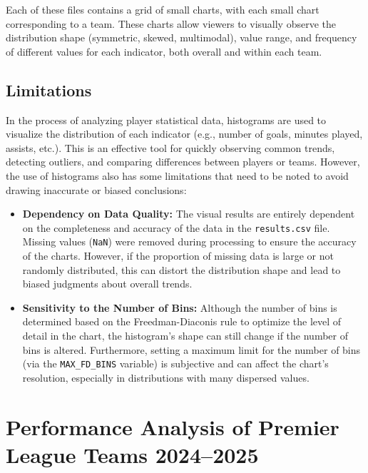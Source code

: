 \documentclass[12pt, a4paper]{report}
\begin{document}
Each of these files contains a grid of small charts, with each small chart corresponding to a team.
These charts allow viewers to visually observe the distribution shape (symmetric, skewed, multimodal), value range, and frequency of different values for each indicator, both overall and within each team.

\subsection{Limitations}
In the process of analyzing player statistical data, histograms are used to visualize the distribution of each indicator (e.g., number of goals, minutes played, assists, etc.).
This is an effective tool for quickly observing common trends, detecting outliers, and comparing differences between players or teams.
However, the use of histograms also has some limitations that need to be noted to avoid drawing inaccurate or biased conclusions:
\begin{itemize}
    \item \textbf{Dependency on Data Quality:} The visual results are entirely dependent on the completeness and accuracy of the data in the \texttt{results.csv} file. Missing values (\texttt{NaN}) were removed during processing to ensure the accuracy of the charts. However, if the proportion of missing data is large or not randomly distributed, this can distort the distribution shape and lead to biased judgments about overall trends.
    \item \textbf{Sensitivity to the Number of Bins:} Although the number of bins is determined based on the Freedman-Diaconis rule to optimize the level of detail in the chart, the histogram's shape can still change if the number of bins is altered. Furthermore, setting a maximum limit for the number of bins (via the \texttt{MAX\_FD\_BINS} variable) is subjective and can affect the chart's resolution, especially in distributions with many dispersed values.
\end{itemize}

\section{Performance Analysis of Premier League Teams 2024–2025}
\end{document}
